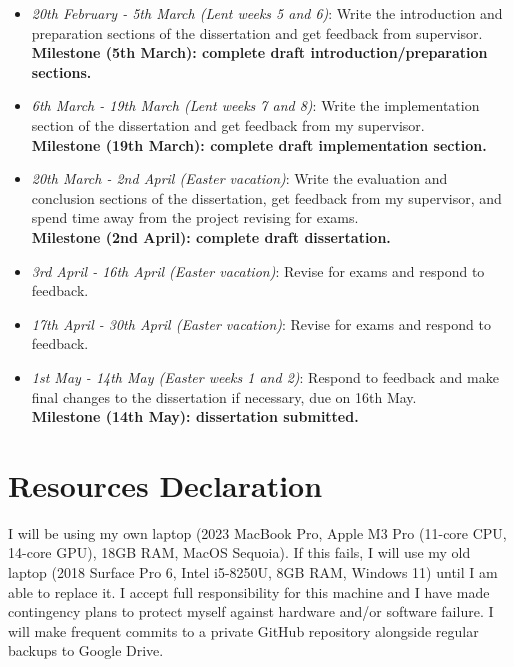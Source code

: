 \documentclass{article}
\begin{document}
\begin{itemize}
\item \emph{20th February - 5th March (Lent weeks 5 and 6)}: Write the introduction and preparation sections of the dissertation and get feedback from supervisor. \\
{\bf Milestone (5th March): complete draft introduction/preparation sections.}

\item \emph{6th March - 19th March (Lent weeks 7 and 8)}: Write the implementation section of the dissertation and get feedback from my supervisor. \\
{\bf Milestone (19th March): complete draft implementation section.}

\item \emph{20th March - 2nd April (Easter vacation)}: Write the evaluation and conclusion sections of the dissertation, get feedback from my supervisor, and spend time away from the project revising for exams. \\
{\bf Milestone (2nd April): complete draft dissertation.}

\item \emph{3rd April - 16th April (Easter vacation)}: Revise for exams and respond to feedback.

\item \emph{17th April - 30th April (Easter vacation)}: Revise for exams and respond to feedback.

\item \emph{1st May - 14th May (Easter weeks 1 and 2)}: Respond to feedback and make final changes to the dissertation if necessary, due on 16th May. \\
{\bf Milestone (14th May): dissertation submitted.}

\end{itemize}

\section*{Resources Declaration}

I will be using my own laptop (2023 MacBook Pro, Apple M3 Pro (11-core CPU, 14-core GPU), 18GB RAM, MacOS Sequoia). If this fails, I will use my old laptop (2018 Surface Pro 6, Intel i5-8250U, 8GB RAM, Windows 11) until I am able to replace it. I accept full responsibility for this machine and I have made contingency plans to protect myself against hardware and/or software failure. I will make frequent commits to a private GitHub repository alongside regular backups to Google Drive.



\end{document}
